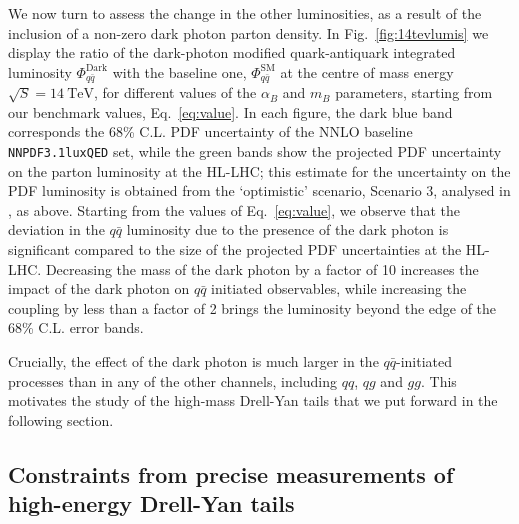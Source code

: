 \documentclass[withindex,glossary]{cam-thesis}
\begin{document}
%
We now turn to assess the change in the other luminosities, as a result of the
inclusion of a non-zero dark photon parton density.
In Fig.~\ref{fig:14tevlumis} we display the ratio of the dark-photon
modified quark-antiquark integrated luminosity
$\Phi_{q\bar{q}}^{\text{Dark}}$ with the baseline one, $\Phi_{q\bar{q}}^{\text{SM}}$ at the centre of mass energy
  $\sqrt{S} = 14\ \text{TeV}$, for different values of the $\alpha_B$
  and $m_B$ parameters, starting from our benchmark values, Eq.~\eqref{eq:value}.
  In each figure, the dark blue band corresponds the 68\% C.L. PDF
  uncertainty of the NNLO baseline {\tt NNPDF3.1luxQED} set, while the
  green bands show the projected PDF uncertainty on the
  parton luminosity at the HL-LHC; this estimate for the uncertainty
  on the PDF luminosity is obtained from the `optimistic' scenario, Scenario 3,
  analysed in \cite{Khalek:2018}, as above. 
  Starting from the values of Eq.~\eqref{eq:value}, we observe that
  the deviation in the $q\bar{q}$ luminosity due to the presence of
  the dark photon is significant compared to the size of the
  projected PDF uncertainties at the HL-LHC. Decreasing the mass of
  the dark photon by a factor of 10 increases the impact of the dark
  photon on $q\bar{q}$ initiated observables, while increasing the
  coupling by less than a factor of 2 brings the luminosity beyond the
  edge of the 68\% C.L. error bands. %

Crucially, the effect of the dark photon is much larger in the $q\bar{q}$-initiated processes than in
any of the other channels, including $qq$, $qg$ and $gg$. This motivates the study of the high-mass Drell-Yan tails that we put
forward in the following section. 


\subsection{Constraints from precise measurements
  of high-energy Drell-Yan tails}
  \label{subsec:dark_constraints}
\end{document}

